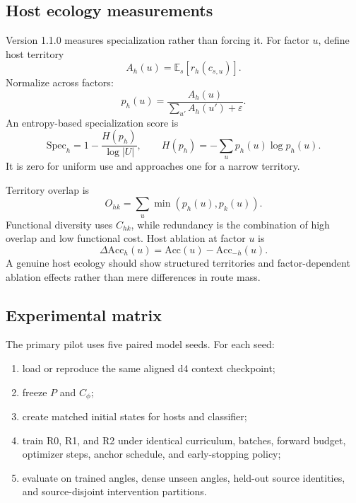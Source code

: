\documentclass[11pt,a4paper]{article}
\newcommand{\E}{\mathbb{E}}
\begin{document}
\subsection{Host ecology measurements}

Version 1.1.0 measures specialization rather than forcing it. For factor $u$, define host territory
\begin{equation}
 A_h(u)=\E_s[r_h(c_{s,u})].
\end{equation}
Normalize across factors:
\begin{equation}
 p_h(u)=\frac{A_h(u)}{\sum_{u'}A_h(u')+\varepsilon}.
\end{equation}
An entropy-based specialization score is
\begin{equation}
 \mathrm{Spec}_h=1-\frac{H(p_h)}{\log|U|},
 \qquad H(p_h)=-\sum_u p_h(u)\log p_h(u).
\end{equation}
It is zero for uniform use and approaches one for a narrow territory.

Territory overlap is
\begin{equation}
 O_{hk}=\sum_u\min(p_h(u),p_k(u)).
\end{equation}
Functional diversity uses $C_{hk}$, while redundancy is the combination of high overlap and low functional cost. Host ablation at factor $u$ is
\begin{equation}
 \Delta\mathrm{Acc}_h(u)=
 \mathrm{Acc}(u)-\mathrm{Acc}_{-h}(u).
\end{equation}
A genuine host ecology should show structured territories and factor-dependent ablation effects rather than mere differences in route mass.

\subsection{Experimental matrix}

The primary pilot uses five paired model seeds. For each seed:
\begin{enumerate}
\item load or reproduce the same aligned d4 context checkpoint;
\item freeze $P$ and $C_\phi$;
\item create matched initial states for hosts and classifier;
\item train R0, R1, and R2 under identical curriculum, batches, forward budget, optimizer steps, anchor schedule, and early-stopping policy;
\item evaluate on trained angles, dense unseen angles, held-out source identities, and source-disjoint intervention partitions.
\end{enumerate}
\end{document}

